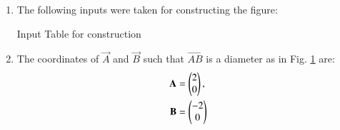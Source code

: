 \renewcommand{\theequation}{\theenumi}
\begin{enumerate}[label=\thesection.\arabic*.,ref=\thesection.\theenumi]

\begin{figure}[!ht]
\centering
\resizebox{\columnwidth}{!}{}
\caption{Using Latex-Tikz}
\label{fig:circle_latex}	
\end{figure}
%
%
%
\item The following inputs were taken for constructing the figure:
\\
%
\begin{table}[ht!]
\centering

\caption{Input Table for construction}
\label{table:table1}	
\end{table}


\item The coordinates of  $\vec{A}$ and  $\vec{B}$ such that  $\vec{AB}$ is a diameter as in Fig. \ref{fig:circle_latex} are:
\\
%
\begin{align}
\mathbf{A} &= \begin{pmatrix}2\\0\end{pmatrix} ,
\label{eq:constr_a}
\\
 \mathbf{B} &= \begin{pmatrix}-2\\0\end{pmatrix} 
\label{eq:constr_b}
\end{align}


\end{enumerate}
